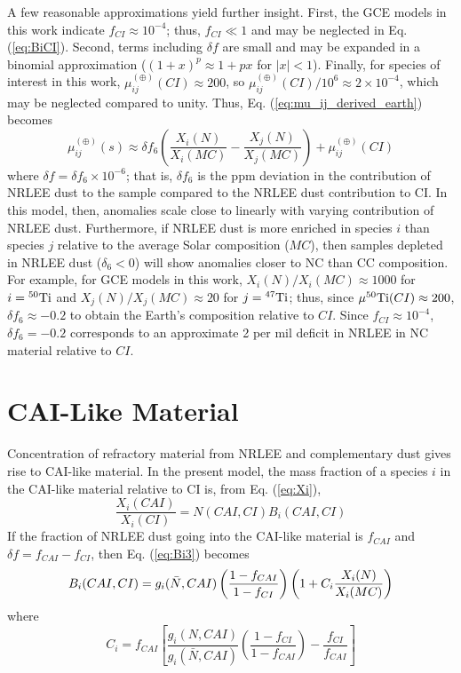 \documentclass[preprint]{revtex4-2}
\begin{document}
A few reasonable approximations yield further insight.  First, the GCE
models in this work indicate $f_{CI} \approx 10^{-4}$; thus, $f_{CI} \ll 1$
and may be neglected in Eq. (\ref{eq:BiCI}).
Second, terms including $\delta f$ are small and may
be expanded in a binomial approximation ($(1 + x)^p \approx 1 + px$ for
$\vert x \vert < 1$).
Finally, for species of interest in this work,
$\mu_{ij}^{(\oplus)}(CI) \approx 200$, so
$\mu_{ij}^{(\oplus)}(CI)/10^6 \approx 2\times 10^{-4}$,
which may be neglected compared to unity.
Thus, Eq. (\ref{eq:mu_ij_derived_earth}) becomes
\begin{equation}
\mu_{ij}^{(\oplus)}(s) \approx \delta f_6
\left(\frac{X_i(N)}{X_i(MC)} - \frac{X_j(N)}{X_j(MC)}\right)
+ \mu_{ij}^{(\oplus)}(CI)
\label{eq:mu_ij_derived_earth2}
\end{equation}
where $\delta f = \delta f_6 \times 10^{-6}$;
that is, $\delta f_6$ is the ppm deviation in
the contribution of NRLEE dust to the sample compared to the NRLEE dust
contribution to CI.  In this model, then, anomalies scale close to linearly
with varying contribution of NRLEE dust.  Furthermore, if NRLEE dust is
more enriched in species $i$ than species $j$ relative to the average
Solar composition ($MC$), then samples depleted in NRLEE dust
($\delta_6 < 0$) will show anomalies closer to NC than CC composition.
For example, for GCE models in this work, $X_i(N)/X_i(MC) \approx 1000$
for $i = {^{50}{\rm Ti}}$ and $X_j(N)/X_j(MC) \approx 20$ for
$j = {^{47}{\rm Ti}}$;
thus, since $\mu^{50}{\rm Ti}(CI) \approx 200$, $\delta f_6 \approx -0.2$
to obtain the Earth's composition relative to $CI$.
Since $f_{CI} \approx 10^{-4}$,
$\delta f_6 = -0.2$ corresponds to an approximate 2 per mil
deficit in NRLEE in NC material relative to $CI$.

\section{CAI-Like Material}

Concentration of refractory material from NRLEE and complementary dust
gives rise to CAI-like material.  In the present model, the mass fraction
of a species $i$ in the CAI-like material relative to CI is,
from Eq. (\ref{eq:Xi}),
\begin{equation}
\frac{X_i(CAI)}{X_i(CI)} = N(CAI, CI) B_i(CAI, CI) 
\label{eq:Xi_cai}
\end{equation}
If the fraction of NRLEE dust going into the CAI-like material is
$f_{CAI}$ and $\delta f = f_{CAI} - f_{CI}$, then Eq. (\ref{eq:Bi3})
becomes
\begin{equation}
B_i(CAI, CI) = \\  
g_i(\bar{N}, CAI)\left(\frac{1 - f_{CAI}}{1 - f_{CI}}\right)
\left(1 + C_i \frac{X_i(N)}{X_i(MC)}\right)
\label{eq:BiCAI}
\end{equation}
where
\begin{equation}
C_i = f_{CAI} \left[\frac{g_i(N, CAI)}{g_i(\bar{N}, CAI)}
\left(\frac{1 - f_{CI}}{1 - f_{CAI}}\right) - \frac{f_{CI}}{f_{CAI}}\right]
\label{eq:C}
\end{equation}
\end{document}
